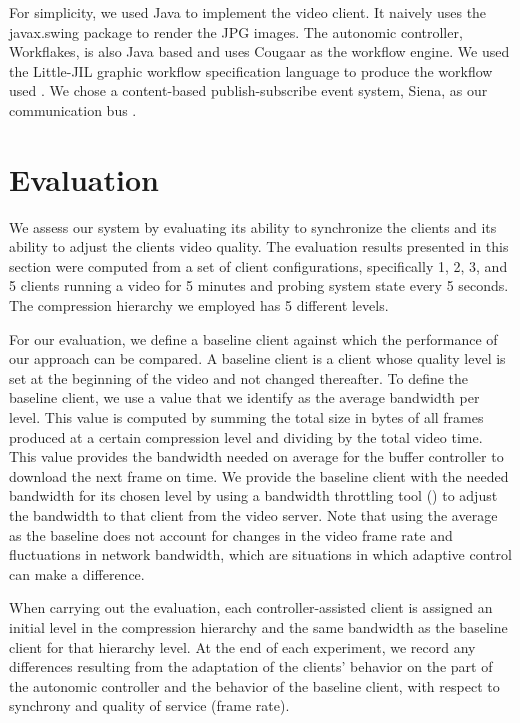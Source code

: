 \documentclass{sig-alternate}
\begin{document}
For simplicity, we used Java to implement the video client.  It
naively uses the javax.swing package to render the JPG images.  The
autonomic controller, Workflakes, is also Java based and uses Cougaar
\cite{COUGAAR} as the workflow engine.  We used the Little-JIL graphic
workflow specification language to produce the workflow used
\cite{LJIL}.  We chose a content-based publish-subscribe event system,
Siena, as our communication bus \cite{SIENA}.

\section{Evaluation} \label{eval}

We assess our system by evaluating its ability to synchronize the
clients and its ability to adjust the clients video quality.  The
evaluation results presented in this section were computed from a set
of client configurations, specifically 1, 2, 3, and 5 clients running
a video for 5 minutes and probing system state every 5 seconds. The
compression hierarchy we employed has 5 different levels.

For our evaluation, we define a baseline client against which the
performance of our approach can be compared.  A baseline client is a
client whose quality level is set at the beginning of the video and
not changed thereafter.  To define the baseline client, we use a value
that we identify as the average bandwidth per level. This value is
computed by summing the total size in bytes of all frames produced at
a certain compression level and dividing by the total video time.
This value provides the bandwidth needed on average for the buffer
controller to download the next frame on time.  We provide the
baseline client with the needed bandwidth for its chosen level by
using a bandwidth throttling tool (\cite{SHAPERD}) to adjust the
bandwidth to that client from the video server.  Note that using the
average as the baseline does not account for changes in the video
frame rate and fluctuations in network bandwidth, which are situations
in which adaptive control can make a difference.

When carrying out the evaluation, each controller-assisted client is
assigned an initial level in the compression hierarchy and the same
bandwidth as the baseline client for that hierarchy level.  At the end
of each experiment, we record any differences resulting from the
adaptation of the clients' behavior on the part of the autonomic
controller and the behavior of the baseline client, with respect to
synchrony and quality of service (frame rate).
\end{document}
